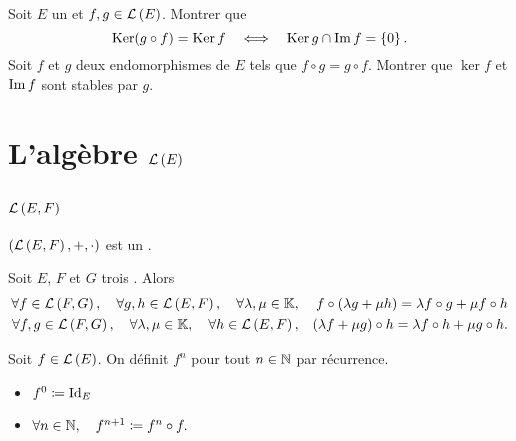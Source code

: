 \documentclass{magnolia}
\begin{document}
\begin{exos}
\exo Soit $E$ un \Kev et $f,g\in\mathcal{L}\left(E\right)$. Montrer que
  \[\mathop{\rm Ker}(g\circ f)=\mathop{\rm Ker} f \quad\Longleftrightarrow\quad \mathop{\rm Ker} g\cap\operatorname{Im} f=\left\{0\right\}.\]
\exo Soit $f$ et $g$ deux endomorphismes de $E$ tels que
  $f\circ g=g\circ f$. Montrer que $\ker f$ et $\operatorname{Im} f$ sont stables par $g$.
\end{exos}

\section{L'algèbre $\mathcal{L}\left(E\right)$}

\subsection{$\mathcal{L}\left(E,F\right)$}

\begin{proposition}[utile=-3]
$\left(\mathcal{L}\left(E,F\right),+,\cdot\right)$ est un \Kev.
\end{proposition}

\begin{proposition}
Soit $E$, $F$ et $G$ trois \Kev. Alors
\begin{eqnarray*}
\forall f\in\mathcal{L}\left(F,G\right),\quad \forall g,h\in\mathcal{L}\left(E,F\right),\quad \forall \lambda,\mu\in\mathbb{K},& &
f\circ\left(\lambda g+\mu h\right)=\lambda f\circ g+\mu f\circ h\\
\forall f,g\in\mathcal{L}\left(F,G\right),\quad \forall \lambda,\mu\in\mathbb{K} ,\quad \forall h\in\mathcal{L}\left(E,F\right),& &
\left(\lambda f+\mu g\right)\circ h=\lambda f\circ h+\mu g\circ h.
\end{eqnarray*}
\end{proposition}


\begin{definition}
Soit $f\in\mathcal{L}\left(E\right)$. On définit $f^n$ pour tout $n\in\mathbb{N}$ par récurrence.
\begin{itemize}
\item $f^0\coloneqq{\rm Id}_E$
\item $\forall n\in\mathbb{N},\quad f^{n+1}\coloneqq f^n\circ f.$
\end{itemize}
\end{definition}
\end{document}
